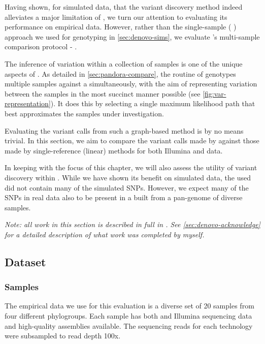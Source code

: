 Having shown, for simulated data, that the \denovo{} variant discovery method indeed alleviates a major limitation of \pandora{}, we turn our attention to evaluating its performance on empirical data. However, rather than the single-sample (\pandora{} ) approach we used for genotyping in \autoref{sec:denovo-sims}, we evaluate \pandora{}'s multi-sample comparison protocol - \compare{}.

The inference of variation within a collection of samples is one of the unique aspects of \pandora{}. As detailed in \autoref{sec:pandora-compare}, the  routine of \pandora{} genotypes multiple samples against a \panrg{} simultaneously, with the aim of representing variation between the samples in the most succinct manner possible (see \autoref{fig:var-representation}). It does this by selecting a single maximum likelihood path that best approximates the samples under investigation.

Evaluating the variant calls from such a graph-based method is by no means trivial. In this section, we aim to compare the variant calls made by \pandora{} against those made by single-reference (linear) methods for both Illumina and \ont{} data.

In keeping with the focus of this chapter, we will also assess the utility of \denovo{} variant discovery within \pandora{}. While we have shown its benefit on simulated data, the \panrg{} used did not contain many of the simulated SNPs. However, we expect many of the SNPs in real data also to be present in a \panrg{} built from a pan-genome of diverse samples. 

\textit{Note: all work in this section is described in full in \cite{pandora}. See \autoref{sec:denovo-acknowledge} for a detailed description of what work was completed by myself.}

\subsection{Dataset}
\label{sec:denovo-empirical-data}

\subsubsection{Samples}
The empirical data we use for this evaluation is a diverse set of 20 \ecoli{} samples from four different phylogroups. Each sample has both \ont{} and Illumina sequencing data and high-quality assemblies available. The sequencing reads for each technology were subsampled to read depth 100x.


